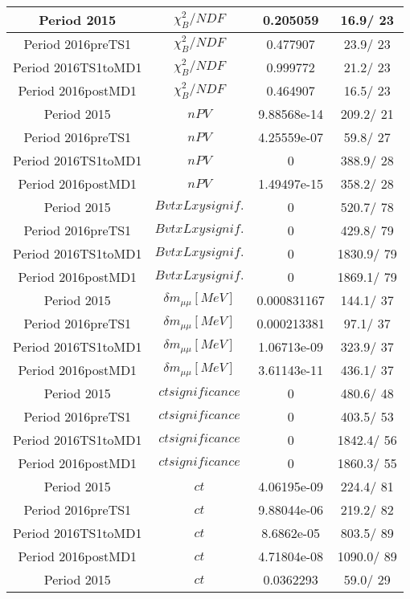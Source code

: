 \documentclass{article}
\begin{document}
\begin{longtable}{c|c|c|c}
\hline
 Period 2015 & $\chi^{2}_{B}/NDF$ & 0.205059 &  16.9/ 23\\
\hline
 Period 2016preTS1 & $\chi^{2}_{B}/NDF$ & 0.477907 &  23.9/ 23\\
\hline
 Period 2016TS1toMD1 & $\chi^{2}_{B}/NDF$ & 0.999772 &  21.2/ 23\\
\hline
 Period 2016postMD1 & $\chi^{2}_{B}/NDF$ & 0.464907 &  16.5/ 23\\
\hline
 Period 2015 & $nPV$ & 9.88568e-14 & 209.2/ 21\\
\hline
 Period 2016preTS1 & $nPV$ & 4.25559e-07 &  59.8/ 27\\
\hline
 Period 2016TS1toMD1 & $nPV$ & 0 & 388.9/ 28\\
\hline
 Period 2016postMD1 & $nPV$ & 1.49497e-15 & 358.2/ 28\\
\hline
 Period 2015 & $BvtxLxy signif.$ & 0 & 520.7/ 78\\
\hline
 Period 2016preTS1 & $BvtxLxy signif.$ & 0 & 429.8/ 79\\
\hline
 Period 2016TS1toMD1 & $BvtxLxy signif.$ & 0 & 1830.9/ 79\\
\hline
 Period 2016postMD1 & $BvtxLxy signif.$ & 0 & 1869.1/ 79\\
\hline
 Period 2015 & $\delta m_{\mu\mu} [MeV]$ & 0.000831167 & 144.1/ 37\\
\hline
 Period 2016preTS1 & $\delta m_{\mu\mu} [MeV]$ & 0.000213381 &  97.1/ 37\\
\hline
 Period 2016TS1toMD1 & $\delta m_{\mu\mu} [MeV]$ & 1.06713e-09 & 323.9/ 37\\
\hline
 Period 2016postMD1 & $\delta m_{\mu\mu} [MeV]$ & 3.61143e-11 & 436.1/ 37\\
\hline
 Period 2015 & $ct significance$ & 0 & 480.6/ 48\\
\hline
 Period 2016preTS1 & $ct significance$ & 0 & 403.5/ 53\\
\hline
 Period 2016TS1toMD1 & $ct significance$ & 0 & 1842.4/ 56\\
\hline
 Period 2016postMD1 & $ct significance$ & 0 & 1860.3/ 55\\
\hline
 Period 2015 & $ct$ & 4.06195e-09 & 224.4/ 81\\
\hline
 Period 2016preTS1 & $ct$ & 9.88044e-06 & 219.2/ 82\\
\hline
 Period 2016TS1toMD1 & $ct$ & 8.6862e-05 & 803.5/ 89\\
\hline
 Period 2016postMD1 & $ct$ & 4.71804e-08 & 1090.0/ 89\\
\hline
 Period 2015 & $ct$ & 0.0362293 &  59.0/ 29\\

\end{longtable}
\end{document}
